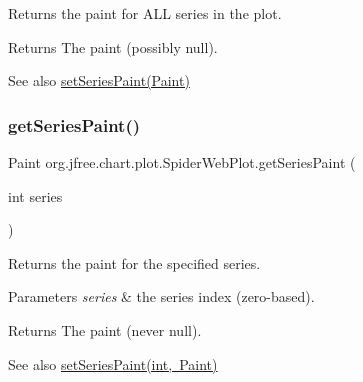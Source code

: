 Returns the paint for A\+LL series in the plot.

\begin{DoxyReturn}{Returns}
The paint (possibly {\ttfamily null}).
\end{DoxyReturn}
\begin{DoxySeeAlso}{See also}
\mbox{\hyperlink{classorg_1_1jfree_1_1chart_1_1plot_1_1_spider_web_plot_ada5fa71ef3e684aeeadd43027093c47a}{set\+Series\+Paint(\+Paint)}} 
\end{DoxySeeAlso}
\mbox{\label{classorg_1_1jfree_1_1chart_1_1plot_1_1_spider_web_plot_aaabad5cb6e0209877572a9ddd69ed4dc}} 
\subsubsection{\texorpdfstring{get\+Series\+Paint()}{getSeriesPaint()}\hspace{0.1cm}{\footnotesize\ttfamily [2/2]}}
{\footnotesize\ttfamily Paint org.\+jfree.\+chart.\+plot.\+Spider\+Web\+Plot.\+get\+Series\+Paint (\begin{DoxyParamCaption}\item[{int}]{series }\end{DoxyParamCaption})}

Returns the paint for the specified series.


\begin{DoxyParams}{Parameters}
{\em series} & the series index (zero-\/based).\\
\hline
\end{DoxyParams}
\begin{DoxyReturn}{Returns}
The paint (never {\ttfamily null}).
\end{DoxyReturn}
\begin{DoxySeeAlso}{See also}
\mbox{\hyperlink{classorg_1_1jfree_1_1chart_1_1plot_1_1_spider_web_plot_af6e4b9783a9e1cb17decded263b28166}{set\+Series\+Paint(int, Paint)}} 
\end{DoxySeeAlso}
\mbox{\label{classorg_1_1jfree_1_1chart_1_1plot_1_1_spider_web_plot_a5ac40ecb9b44741d1be501a5dfab73c8}} 

